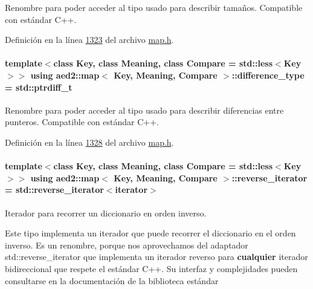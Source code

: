 Renombre para poder acceder al tipo usado para describir tamaños. Compatible con estándar C++. 



Definición en la línea \hyperlink{map_8h_source_l01323}{1323} del archivo \hyperlink{map_8h_source}{map.\-h}.

\hypertarget{classaed2_1_1map_a2f55b88809000fcbfce1c6cfef1ba74d_a2f55b88809000fcbfce1c6cfef1ba74d}{
\paragraph[{difference\-\_\-type}]{\setlength{\rightskip}{0pt plus 5cm}template$<$class Key, class Meaning, class Compare = std\-::less$<$\-Key$>$$>$ using {\bf aed2\-::map}$<$ Key, Meaning, Compare $>$\-::{\bf difference\-\_\-type} =  std\-::ptrdiff\-\_\-t}}\label{classaed2_1_1map_a2f55b88809000fcbfce1c6cfef1ba74d_a2f55b88809000fcbfce1c6cfef1ba74d}


Renombre para poder acceder al tipo usado para describir diferencias entre punteros. Compatible con estándar C++. 



Definición en la línea \hyperlink{map_8h_source_l01328}{1328} del archivo \hyperlink{map_8h_source}{map.\-h}.

\hypertarget{classaed2_1_1map_a8e6a592062260177fd73b2f9897b1dd5_a8e6a592062260177fd73b2f9897b1dd5}{
\paragraph[{reverse\-\_\-iterator}]{\setlength{\rightskip}{0pt plus 5cm}template$<$class Key, class Meaning, class Compare = std\-::less$<$\-Key$>$$>$ using {\bf aed2\-::map}$<$ Key, Meaning, Compare $>$\-::{\bf reverse\-\_\-iterator} =  std\-::reverse\-\_\-iterator$<${\bf iterator}$>$}}\label{classaed2_1_1map_a8e6a592062260177fd73b2f9897b1dd5_a8e6a592062260177fd73b2f9897b1dd5}


Iterador para recorrer un diccionario en orden inverso. 

Este tipo implementa un iterador que puede recorrer el diccionario en el orden inverso. Es un renombre, porque nos aprovechamos del adaptador {\ttfamily std\-::reverse\-\_\-iterator} que implementa un iterador reverso para {\bfseries cualquier} iterador bidireccional que respete el estándar C++. Su interfaz y complejidades pueden consultarse en la documentación de la biblioteca estándar

